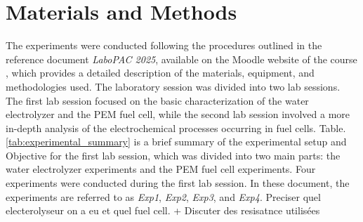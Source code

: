 \section{Materials and Methods}

The experiments were conducted following the procedures outlined in the reference document \textit{LaboPAC 2025}, available on the Moodle website of the course \cite{labopac2025}, which provides a detailed description of the materials, equipment, and methodologies used.
The laboratory session was divided into two lab sessions. The  first lab session focused on the basic characterization of the water electrolyzer and the PEM fuel cell, while the second lab session involved a more in-depth analysis of the electrochemical processes occurring in fuel cells.
Table. \ref{tab:experimental_summary} is a brief summary of the experimental setup and Objective for the first lab session, which was divided into two main parts: the water electrolyzer experiments and the PEM fuel cell experiments.
Four experiments were conducted during the first lab session. In these document, the experiments are referred to as \textit{Exp1}, \textit{Exp2}, \textit{Exp3}, and \textit{Exp4}.
{\color{red} Preciser quel electerolyseur on a eu et quel fuel cell. + Discuter des resisatnce utilisées}

